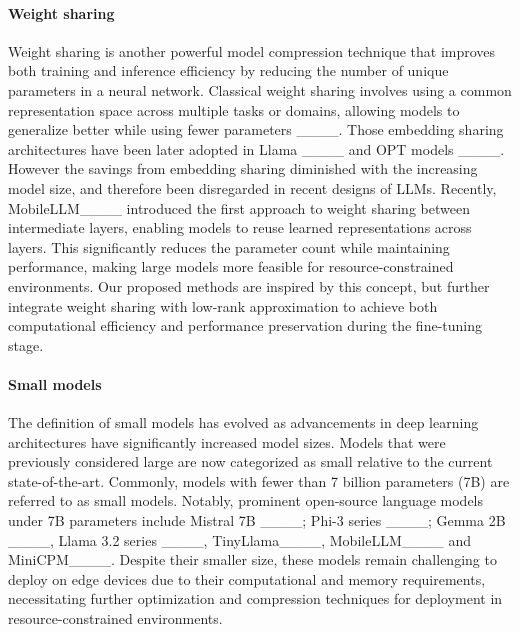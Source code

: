 \paragraph{Weight sharing}
Weight sharing is another powerful model compression technique that improves both training and inference efficiency by reducing the number of unique parameters in a neural network. Classical weight sharing involves using a common representation space across multiple tasks or domains, allowing models to generalize better while using fewer parameters ____. Those embedding sharing architectures have been later adopted in Llama ____ and OPT models ____. However the savings from embedding sharing diminished with the increasing model size, and therefore been disregarded in recent designs of LLMs. Recently, MobileLLM____ introduced the first approach to weight sharing between intermediate layers, enabling models to reuse learned representations across layers. This significantly reduces the parameter count while maintaining performance, making large models more feasible for resource-constrained environments. Our proposed methods are inspired by this concept, but further integrate weight sharing with low-rank approximation to achieve both computational efficiency and performance preservation during the fine-tuning stage.


\vspace{-1em}
\paragraph{Small models}
The definition of small models has evolved as advancements in deep learning architectures have significantly increased model sizes. Models that were previously considered large are now categorized as small relative to the current state-of-the-art. Commonly, models with fewer than 7 billion parameters (7B) are referred to as small models. Notably, prominent open-source language models under 7B parameters include Mistral 7B ____; Phi-3 series ____; Gemma 2B ____, Llama 3.2 series ____, TinyLlama____, MobileLLM____ and MiniCPM____. Despite their smaller size, these models remain challenging to deploy on edge devices due to their computational and memory requirements, necessitating further optimization and compression techniques for deployment in resource-constrained environments.
